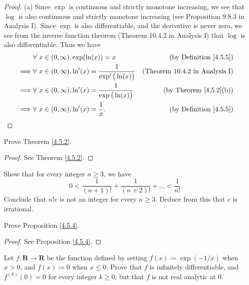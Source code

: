 \begin{proof}{(a)}
    Since \(\exp\) is continuous and strictly monotone increasing, we see that \(\log\) is also continuous and strictly monotone increasing (see Proposition 9.8.3 in Analysis I).
    Since \(\exp\) is also differentiable, and the derivative is never zero, we see from the inverse function theorem (Theorem 10.4.2 in Analysis I) that \(\log\) is also differentiable.
    Thus we have
    \begin{align*}
                 & \forall\ x \in (0, \infty), \exp(\ln(x)) = x                          & \text{(by Definition \ref{4.5.5})}    \\
        \implies & \forall\ x \in (0, \infty), \ln'(x) = \frac{1}{\exp'\big(\ln(x)\big)} & \text{(Theorem 10.4.2 in Analysis I)} \\
        \implies & \forall\ x \in (0, \infty), \ln'(x) = \frac{1}{\exp\big(\ln(x)\big)}  & \text{(by Theorem \ref{4.5.2}(b))}    \\
        \implies & \forall\ x \in (0, \infty), \ln'(x) = \frac{1}{x}.                    & \text{(by Definition \ref{4.5.5})}
    \end{align*}
\end{proof}

\exercisesection

\begin{exercise}\label{ex 4.5.1}
    Prove Theorem \ref{4.5.2}.
\end{exercise}

\begin{proof}
    See Theorem \ref{4.5.2}.
\end{proof}

\begin{exercise}\label{ex 4.5.2}
    Show that for every integer \(n \geq 3\), we have
    \[
        0 < \frac{1}{(n + 1)!} + \frac{1}{(n + 2)!} + \dots < \frac{1}{n!}.
    \]
    Conclude that \(n! e\) is not an integer for every \(n \geq 3\).
    Deduce from this that \(e\) is irrational.
\end{exercise}

\begin{exercise}\label{ex 4.5.3}
    Prove Proposition \ref{4.5.4}.
\end{exercise}

\begin{proof}
    See Proposition \ref{4.5.4}.
\end{proof}

\begin{exercise}\label{ex 4.5.4}
    Let \(f : \mathbf{R} \to \mathbf{R}\) be the function defined by setting \(f(x) \coloneqq \exp(-1 / x)\) when \(x > 0\), and \(f(x) \coloneqq 0\) when \(x \leq 0\).
    Prove that \(f\) is infinitely differentiable, and \(f^{(k)}(0) = 0\) for every integer \(k \geq 0\), but that \(f\) is not real analytic at \(0\).
\end{exercise}

